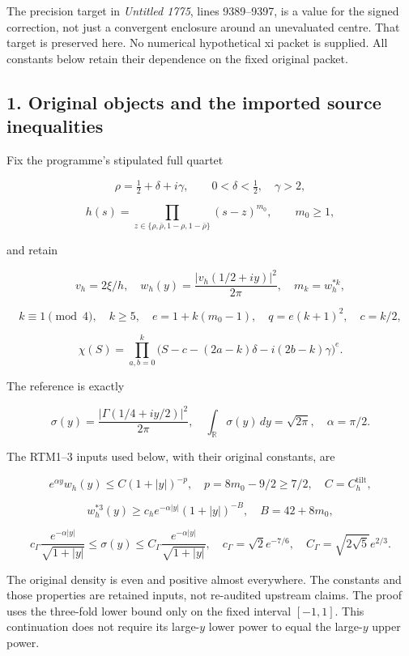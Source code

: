 \documentclass[11pt,a4paper]{article}
\begin{document}
The precision target in \emph{Untitled 1775}, lines 9389--9397, is a value for the signed correction, not just a convergent enclosure around an unevaluated centre. That target is preserved here. No numerical hypothetical xi packet is supplied. All constants below retain their dependence on the fixed original packet.

\subsection{1. Original objects and the imported source inequalities}\label{acw:original-objects-and-the-imported-source-inequalities}

Fix the programme's stipulated full quartet

\[
\rho=\tfrac12+\delta+i\gamma,\qquad
0<\delta<\tfrac12,\quad\gamma>2,
\]

\[
h(s)=\prod_{z\in\{\rho,\bar\rho,1-\rho,1-\bar\rho\}}(s-z)^{m_0},
\qquad m_0\ge1,
\]

and retain

\[
v_h=2\xi/h,\quad
w_h(y)=\frac{|v_h(1/2+iy)|^2}{2\pi},\quad m_k=w_h^{*k},
\]

\[
k\equiv1\pmod4,\quad k\ge5,\quad e=1+k(m_0-1),\quad
q=e(k+1)^2,\quad c=k/2,
\]

\[
\chi(S)=\prod_{a,b=0}^k
\bigl(S-c-(2a-k)\delta-i(2b-k)\gamma\bigr)^e.
\]

The reference is exactly

\[
\sigma(y)=\frac{|\Gamma(1/4+iy/2)|^2}{2\pi},\quad
\int_{\mathbb R}\sigma(y)\,dy=\sqrt{2\pi},\quad \alpha=\pi/2.
\]

The RTM1--3 inputs used below, with their original constants, are

\[
e^{\alpha y}w_h(y)\le C(1+|y|)^{-p},\quad
p=8m_0-9/2\ge7/2,\quad C=C_h^{\mathrm{tilt}},
\tag{ACW1}
\]

\[
w_h^{*3}(y)\ge c_h e^{-\alpha|y|}(1+|y|)^{-B},
\quad B=42+8m_0,
\]

\[
c_\Gamma\frac{e^{-\alpha|y|}}{\sqrt{1+|y|}}
\le\sigma(y)\le
C_\Gamma\frac{e^{-\alpha|y|}}{\sqrt{1+|y|}},
\quad
c_\Gamma=\sqrt2e^{-7/6},\quad
C_\Gamma=\sqrt{2\sqrt5}e^{2/3}.
\]

The original density is even and positive almost everywhere. The constants and those properties are retained inputs, not re-audited upstream claims. The proof uses the three-fold lower bound only on the fixed interval \([-1,1]\). This continuation does not require its large-\(y\) lower power to equal the large-\(y\) upper power.
\end{document}
